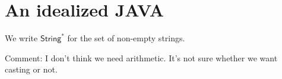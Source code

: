 \documentclass[a4paper, 11pt, english]{article}
\author{Thomas Cuvillier}
\begin{document}
\section{An idealized JAVA}

\newcommand{\String}{\mathsf{String}}
We write $\String^*$ for the set of non-empty strings.

Comment: I don't think we need arithmetic.
It's not sure whether we want casting or not.

\newcommand{\IdealJava}{\mathsf{WJava}}

\newcommand{\class}{\mathsf{class} \;}
\newcommand{\interface}{\mathsf{interface}}
\newcommand{\extends}{\; \mathsf{extends} \;}
\newcommand{\implements}{\; \mathsf{implements} \;}
\newcommand{\object}{\mathsf{Object}}
\newcommand{\method}{\mathsf{m}}
\newcommand{\methodSignature}{\mathsf{msig}}
\newcommand{\methodSet}{\mathcal{M}}
\newcommand{\classSet}{\mathcal{C}}
\newcommand{\interfaceSet}{\mathcal{I}}
\newcommand{\typeSet}{\mathbb{T}}
\newcommand{\methodSignatureSet}{MSig}
\newcommand{\new}{\mathsf{new}}
\newcommand{\lock}{\mathsf{lock} \;}
\newcommand{\unlock}{\mathsf{unlock} \;}
\newcommand{\arr}{\mathsf{arr}}
\newcommand{\this}{\mathsf{this}}
\newcommand{\Tree}{\mathsf{Tree}}
\newcommand{\msig}{\mathrm{m}}
\newcommand{\ArrayWrapper}{\mathsf{ArrayWrapper}}
\newcommand{\lettext}{\mathsf{let} \;}
\newcommand{\intext}{\mathsf{in} \;}
\newcommand{\Unit}{\mathsf{Unit}}
\newcommand{\nul}{\mathsf{null}}
\newcommand{\return}{\mathsf{return} \;}
\newcommand{\synchronized}{\mathsf{synchronized}}
\newcommand{\start}{\mathsf{start}}
\newcommand{\instanceof}{\mathsf{instanceof} \;}
\newcommand{\iftext}{\mathsf{if} \; }
\newcommand{\thentext}{\mathsf{then} \;}
\newcommand{\elsetext}{\mathsf{else} \;}
\newcommand{\visible}{\mathsf{Visible}}
\newcommand{\nameFields}{\mathsf{nameFields}}
\newcommand{\Boolean}{\mathbf{B}}
\end{document}
